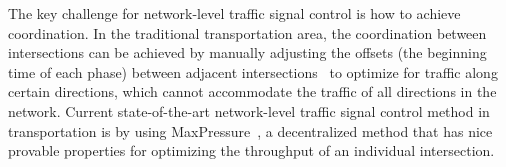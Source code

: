 



The key challenge for network-level traffic signal control is how to achieve coordination. In the traditional transportation area, the coordination between intersections can be achieved by manually adjusting the offsets (the beginning time of each phase) between adjacent intersections~\cite{Roess2011t,little1981maxband} to optimize for traffic along certain directions, which cannot accommodate the traffic of all directions in the network. Current state-of-the-art network-level traffic signal control method in transportation is by using MaxPressure~\cite{varaiya2013max,maxpressure14}, a decentralized method that has nice provable properties for optimizing the throughput of an individual intersection. 

